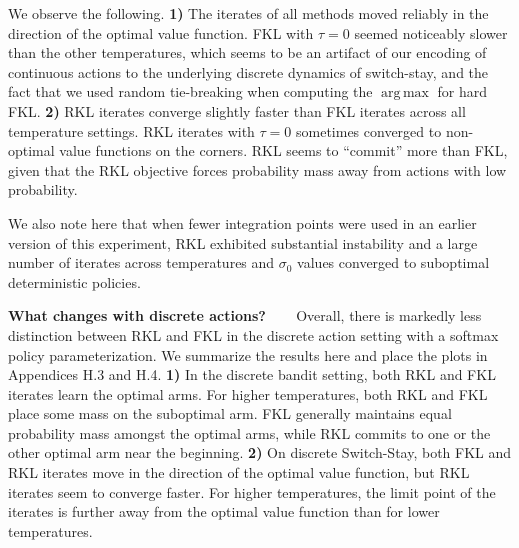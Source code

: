 \documentclass[twoside,11pt]{article}
\DeclareMathOperator*{\argmax}{arg\,max}
\newcommand{\myparagraph}[1]{\textbf{#1} \ \ \ }
\begin{document}



We observe the following.
\textbf{1)} The iterates of all methods moved reliably in the direction of the optimal value function. FKL with $\tau = 0$ seemed noticeably slower than the other temperatures, which seems to be an artifact of our encoding of continuous actions to the underlying discrete dynamics of switch-stay, and the fact that we used random tie-breaking when computing the $\argmax$ for hard FKL. 
\textbf{2)} RKL iterates converge slightly faster than FKL iterates across all temperature settings. RKL iterates with $\tau = 0$ sometimes converged to non-optimal value functions on the corners. RKL seems to ``commit'' more than FKL, given that the RKL objective forces probability mass away from actions with low probability. 

We also note here that when fewer integration points were used in an earlier version of this experiment, RKL exhibited substantial instability and a large number of iterates across temperatures and $\sigma_0$ values converged to suboptimal deterministic policies. 

 
\myparagraph{What changes with discrete actions?}
Overall, there is markedly less distinction between RKL and FKL in the discrete action setting with a softmax policy parameterization. We summarize the results here and place the plots in Appendices H.3 and H.4.
\textbf{1)} In the discrete bandit setting, both RKL and FKL iterates learn the optimal arms. For higher temperatures, both RKL and FKL place some mass on the suboptimal arm. FKL generally maintains equal probability mass amongst the optimal arms, while RKL commits to one or the other optimal arm near the beginning. 
\textbf{2)} On discrete Switch-Stay, both FKL and RKL iterates move in the direction of the optimal value function, but RKL iterates seem to converge faster. For higher temperatures, the limit point of the iterates is further away from the optimal value function than for lower temperatures. 
\end{document}
